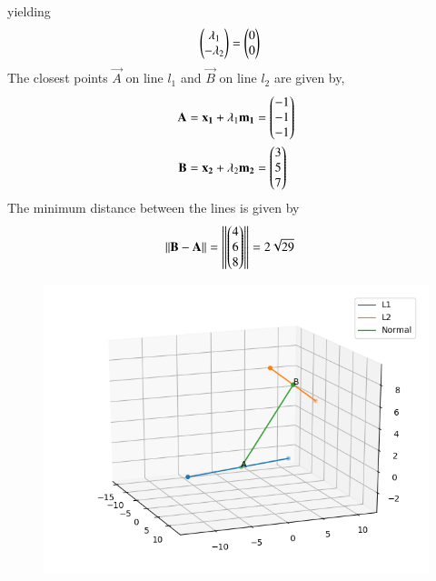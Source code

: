 \documentclass[journal,12pt,twocolumn]{IEEEtran}
\begin{document}
yielding
\begin{align}
\begin{pmatrix}\lambda_1\\-\lambda_2\end{pmatrix} &= \begin{pmatrix}0\\0\end{pmatrix}
\end{align}
The closest points $\vec{A}$ on line $l_1$ and $\vec{B}$ on line $l_2$ are given by,
\begin{align}
\mathbf{A} &= \mathbf{x_1} + \lambda_1\mathbf{m_1}
= \begin{pmatrix}-1\\-1\\-1\end{pmatrix}\\
\mathbf{B} &= \mathbf{x_2} + \lambda_2\mathbf{m_2}
= \begin{pmatrix}3\\5\\7\end{pmatrix}
\end{align}
The minimum distance between the lines is given by
\begin{align}
\left\lVert\mathbf{B}-\mathbf{A}\right\rVert &= \left\lVert\begin{pmatrix}4\\6\\8\end{pmatrix}\right\rVert
= 2\sqrt{29}
\end{align}
%
\begin{figure}[!ht]
\centering
\includegraphics[width=\columnwidth]{chapters/12/11/2/15/figs/Figure_1.png}
\caption{}
\label{fig:chapters/12/11/2/15/}
\end{figure}
\end{document}
